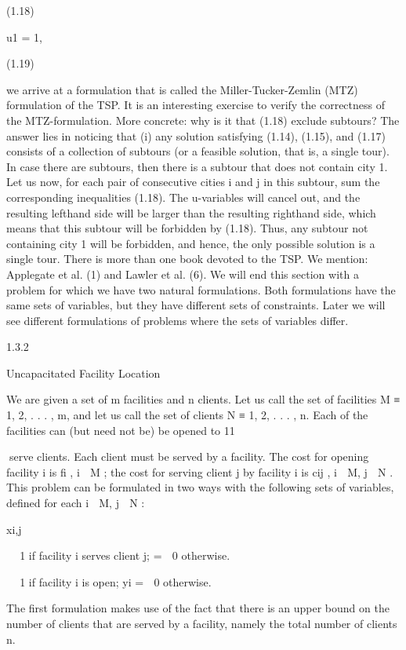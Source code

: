 \documentclass[titlepage]{book}
\begin{document}
(1.18)

u1 = 1,

(1.19)

we arrive at a formulation that is called the Miller-Tucker-Zemlin (MTZ) formulation of the TSP. It is
an interesting exercise to verify the correctness of the MTZ-formulation. More concrete: why is it that
(1.18) exclude subtours? The answer lies in noticing that (i) any solution satisfying (1.14), (1.15), and
(1.17) consists of a collection of subtours (or a feasible solution, that is, a single tour). In case there are
subtours, then there is a subtour that does not contain city 1. Let us now, for each pair of consecutive
cities i and j in this subtour, sum the corresponding inequalities (1.18). The u-variables will cancel out,
and the resulting lefthand side will be larger than the resulting righthand side, which means that this
subtour will be forbidden by (1.18). Thus, any subtour not containing city 1 will be forbidden, and hence,
the only possible solution is a single tour.
There is more than one book devoted to the TSP. We mention: Applegate et al. (1) and Lawler et al. (6).
We will end this section with a problem for which we have two natural formulations. Both formulations
have the same sets of variables, but they have different sets of constraints. Later we will see different
formulations of problems where the sets of variables differ.

1.3.2

Uncapacitated Facility Location

We are given a set of m facilities and n clients. Let us call the set of facilities M ≡ {1, 2, . . . , m}, and
let us call the set of clients N ≡ {1, 2, . . . , n}. Each of the facilities can (but need not be) be opened to
11

serve clients. Each client must be served by a facility. The cost for opening facility i is fi , i ∈ M ; the
cost for serving client j by facility i is cij , i ∈ M, j ∈ N . This problem can be formulated in two ways
with the following sets of variables, defined for each i ∈ M, j ∈ N :

xi,j


 1 if facility i serves client j;
=
 0 otherwise.


 1 if facility i is open;
yi =
 0 otherwise.

The first formulation makes use of the fact that there is an upper bound on the number of clients that
are served by a facility, namely the total number of clients n.
\end{document}
